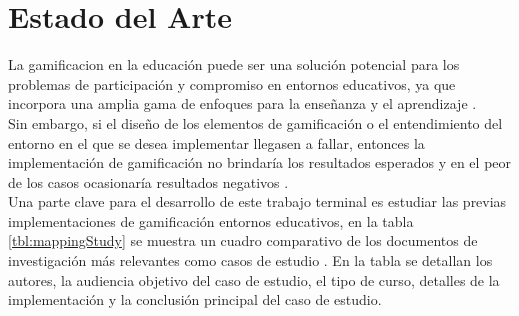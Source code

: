 \section{Estado del Arte} \label{sec:estadoArte}

 La \gls{gamificacion} en la educación puede ser una solución potencial para los
 problemas de participación y compromiso en entornos educativos, ya que incorpora una amplia
 gama de enfoques para la enseñanza y el aprendizaje \cite{Aldemir}.\\

 \noindent Sin embargo, si el diseño de los elementos de gamificación o el entendimiento del entorno en el que se 
 desea implementar llegasen a fallar, entonces la implementación de gamificación no brindaría
 los resultados esperados y en el peor de los casos ocasionaría resultados negativos
 \cite{GamInE-Learning}.\\

 \noindent Una parte clave para el desarrollo de este trabajo terminal es estudiar las previas implementaciones 
 de gamificación entornos educativos, en la tabla \ref{tbl:mappingStudy} se muestra un cuadro comparativo de los documentos de investigación más relevantes como casos de estudio \cite{mappingStudy}. En la tabla se detallan los autores, la audiencia objetivo del caso de estudio, el tipo de curso, detalles de la implementación y la conclusión principal del caso de estudio.\\

